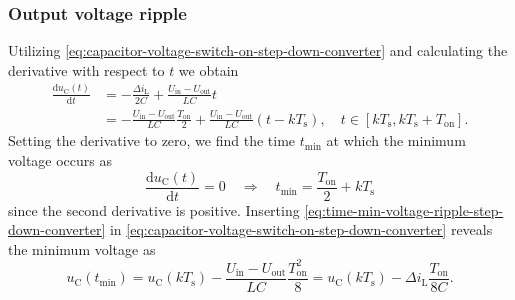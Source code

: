 \begin{frame}[fragile]
\begin{figure}
    \end{figure}
\end{frame}


\begin{frame}
    \frametitle{Output voltage ripple}
    Utilizing \eqref{eq:capacitor-voltage-switch-on-step-down-converter} and calculating the derivative with respect to $t$ we obtain
    \begin{equation}
        \begin{split}
            \frac{\mathrm{d}u_\mathrm{C}(t)}{\mathrm{d}t} &= -\frac{\Delta i_\mathrm{L}}{2 C} + \frac{U_\mathrm{in}-U_\mathrm{out}}{LC} t\\
                                                          &= -\frac{U_\mathrm{in}-U_\mathrm{out}}{LC}\frac{T_\mathrm{on}}{2} +\frac{U_\mathrm{in}-U_\mathrm{out}}{LC} (t-kT_\mathrm{s}), \quad t\in [k T_\mathrm{s}, k T_\mathrm{s} + T_\mathrm{on}].
        \end{split}
    \end{equation}
    Setting the derivative to zero, we find the time $t_\mathrm{min}$ at which the minimum voltage occurs as
    \begin{equation}
        \frac{\mathrm{d}u_\mathrm{C}(t)}{\mathrm{d}t} = 0 \quad \Rightarrow \quad t_\mathrm{min} = \frac{T_\mathrm{on}}{2} + kT_\mathrm{s}
        \label{eq:time-min-voltage-ripple-step-down-converter}
    \end{equation}
    since the second derivative is positive. Inserting \eqref{eq:time-min-voltage-ripple-step-down-converter} in \eqref{eq:capacitor-voltage-switch-on-step-down-converter} reveals the minimum voltage as
    \begin{equation}
        u_\mathrm{C}(t_\mathrm{min}) = u_\mathrm{C}(kT_\mathrm{s}) - \frac{U_\mathrm{in}-U_\mathrm{out}}{LC} \frac{T_\mathrm{on}^2}{8} = u_\mathrm{C}(kT_\mathrm{s}) - \Delta i_\mathrm{L}\frac{T_\mathrm{on}}{8C}.
    \end{equation}
\end{frame}

